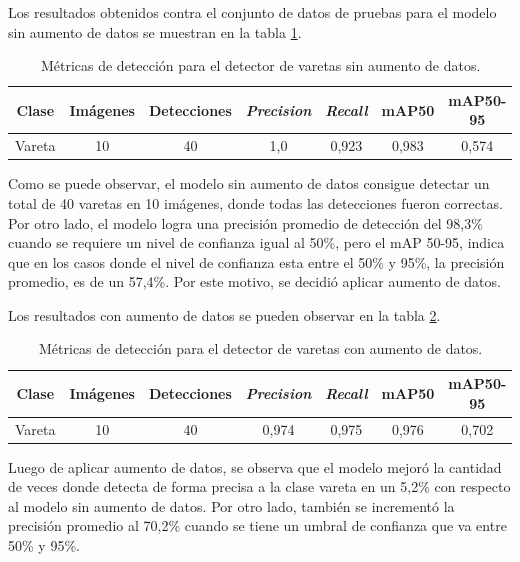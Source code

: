 Los resultados obtenidos contra el conjunto de datos de pruebas para el modelo sin aumento de datos se muestran en la tabla \ref{tab:resultadosVareta}.

\begin{table}[h]
	\centering
	\caption{Métricas de detección para el detector de varetas sin aumento de datos.}
	\begin{tabular}{c c c c c c c}    
		\toprule
		\textbf{Clase}&\textbf{Imágenes}&\textbf{Detecciones}&\textbf{\textit{Precision}} &\textbf{\textit{Recall}}&\textbf{mAP50}&\textbf{mAP50-95}\\
		\midrule
		Vareta & 10 & 40 & 1,0 & 0,923 & 0,983 & 0,574\\		
		\bottomrule
		\hline
	\end{tabular}
	\label{tab:resultadosVareta}
\end{table}

Como se puede observar, el modelo sin aumento de datos consigue detectar un total de 40 varetas en 10 imágenes, donde todas las detecciones fueron correctas. Por otro lado, el modelo logra una precisión promedio de detección del 98,3\% cuando se requiere un nivel de confianza igual al 50\%, pero el mAP 50-95, indica que en los casos donde el nivel de confianza esta entre el 50\% y 95\%, la precisión promedio, es de un 57,4\%. Por este motivo, se decidió aplicar aumento de datos.

Los resultados con aumento de datos se pueden observar en la tabla \ref{tab:resultadosVaretaConAug}.

\begin{table}[h]
	\centering
	\caption{Métricas de detección para el detector de varetas con aumento de datos.}
	\begin{tabular}{c c c c c c c}    
		\toprule
		\textbf{Clase}&\textbf{Imágenes}&\textbf{Detecciones}&\textbf{\textit{Precision}} &\textbf{\textit{Recall}}&\textbf{mAP50}&\textbf{mAP50-95}\\
		\midrule
		Vareta & 10 & 40 & 0,974 & 0,975 & 0,976 & 0,702\\		
		\bottomrule
		\hline
	\end{tabular}
	\label{tab:resultadosVaretaConAug}
\end{table}

Luego de aplicar aumento de datos, se observa que el modelo mejoró la cantidad de veces donde detecta de forma precisa a la clase vareta en un 5,2\% con respecto al modelo sin aumento de datos. Por otro lado, también se incrementó la precisión promedio al 70,2\% cuando se tiene un umbral de confianza que va entre 50\% y 95\%.

